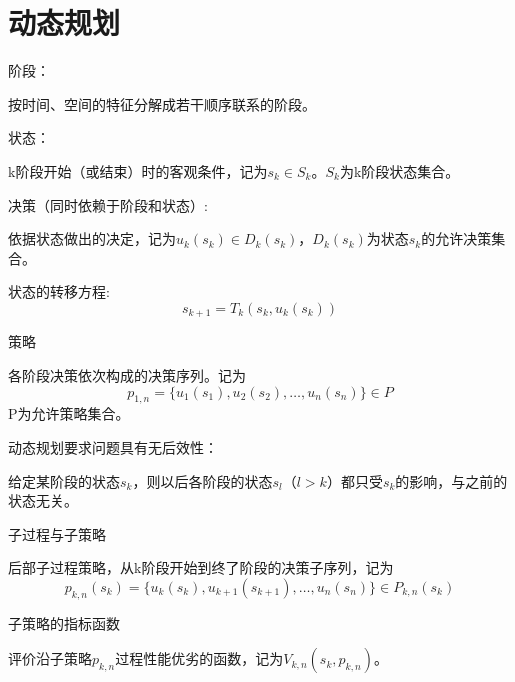 \documentclass[12pt, a4paper, oneside, UTF8]{ctexbook}
\begin{document}
% 
\else
\fi

\chapter{动态规划}

\begin{definition}
    阶段：

按时间、空间的特征分解成若干顺序联系的阶段。

\end{definition}

\begin{definition}
    状态：

k阶段开始（或结束）时的客观条件，记为$s_k \in S_k$。$S_k$为k阶段状态集合。

\end{definition}
\begin{definition}
    决策（同时依赖于阶段和状态）:

依据状态做出的决定，记为$u_k(s_k) \in D_k(s_k)$，$D_k(s_k)$为状态$s_k$的允许决策集合。
\end{definition}
\begin{definition}
    状态的转移方程:
\[ s_{k+1} = T_k(s_k, u_k(s_k)) \]
\end{definition}

\begin{definition}
    策略

各阶段决策依次构成的决策序列。记为
\[ p_{1,n} = \{u_1(s_1), u_2(s_2), \ldots, u_n(s_n)\} \in P \]
P为允许策略集合。
\end{definition}

\begin{remark}
    动态规划要求问题具有无后效性：

给定某阶段的状态\( s_k \)，则以后各阶段的状态\( s_l \)（\( l > k \)）都只受\( s_k \)的影响，与之前的状态无关。
\end{remark}

\begin{definition}
    子过程与子策略

后部子过程策略，从k阶段开始到终了阶段的决策子序列，记为
$$
p_{k,n}(s_k) = \{u_k(s_k), u_{k+1}(s_{k+1}), \ldots, u_n(s_n)\} \in P_{k,n}(s_k)
$$
\end{definition}

\begin{definition}
    子策略的指标函数

评价沿子策略$p_{k,n}$过程性能优劣的函数，记为$V_{k,n}(s_k, p_{k,n})$。
\end{definition}
\end{document}
